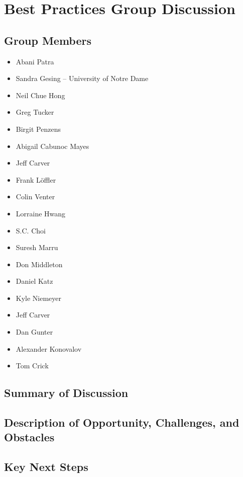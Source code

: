 \section{Best Practices Group Discussion}
\label{sec:appendix_best_practices}


\subsection{Group Members}

\begin{itemize}
\item Abani Patra 
\item Sandra Gesing -- University of Notre Dame
\item Neil Chue Hong 
\item Greg Tucker 
\item Birgit Penzens 
\item Abigail Cabunoc Mayes 
\item Jeff Carver 
\item Frank L\"offler 
\item Colin Venter 
\item Lorraine Hwang 
\item S.C. Choi
\item Suresh Marru 
\item Don Middleton 
\item Daniel Katz  
\item Kyle Niemeyer 
\item Jeff Carver 
\item Dan Gunter 
\item Alexander Konovalov 
\item Tom Crick 

\end{itemize}

\subsection{Summary of Discussion}

\subsection{Description of Opportunity, Challenges, and Obstacles}


\subsection{Key Next Steps}


